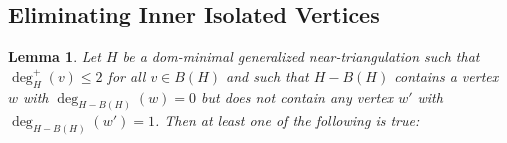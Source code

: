 \documentclass[12pt]{article}
\newtheorem{lem}{Lemma}
\theoremstyle{definition}
\begin{document}
\subsection{Eliminating Inner Isolated Vertices}

\begin{lem}\label{degree_zero_killer}
  Let $H$ be a dom-minimal generalized near-triangulation such that $\deg^+_H(v)\le 2$ for all $v\in B(H)$ and such that $H-B(H)$ contains a vertex $w$ with $\deg_{H-B(H)}(w)=0$ but does not contain any vertex $w'$ with $\deg_{H-B(H)}(w')=1$.  Then at least one of the following is true:
\end{lem}
\end{document}
